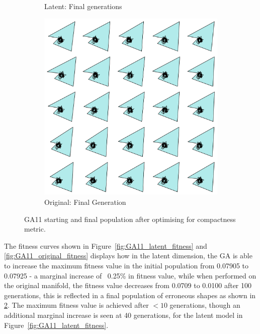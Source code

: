 \documentclass{article}
\begin{document}
\begin{figure}[H]
\begin{subfigure}[b]{0.32\textwidth}
        \caption{Latent: Final generations}
        \label{fig:GA11__latent_final}
    \end{subfigure}
    \hfill
    \begin{subfigure}[b]{0.32\textwidth}
        \centering
        \includegraphics[width=\textwidth]{figures/GAResults/GA11/original/original_final_gen.png}
        \caption{Original: Final Generation}
        \label{fig:GA11_original_final}
    \end{subfigure}
    \caption{GA11 starting and final population after optimising for compactness metric.}
    \label{fig:GA11_before_after_GA}
\end{figure}

The fitness curves  shown in Figure~\ref{fig:GA11_latent_fitness} and \ref{fig:GA11_original_fitness} displays how in the latent dimension, the GA is able to increase the maximum fitness value in the initial population from 0.07905 to 0.07925 - a marginal increase of ~0.25\% in fitness value, while when performed on the original manifold, the fitness value decreases from 0.0709 to 0.0100 after 100 generations, this is reflected in a final population of erroneous shapes as shown in \ref{fig:GA11_original_final}. The maximum fitness value is achieved after $<10$ generations, though an additional marginal increase is seen at 40 generations, for the latent model in Figure~\ref{fig:GA11_latent_fitness}.
\end{document}
